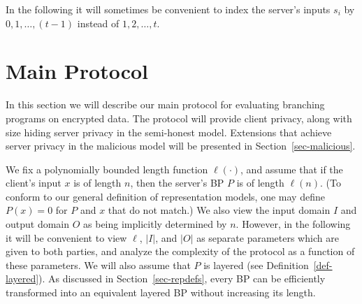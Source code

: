 \documentclass[11pt]{article}
\newcommand{\length}{{\sf length}}
\newcommand\bp{\mbox{BP}\xspace}
\begin{document}
In the following it will sometimes be convenient to index the
server's inputs $s_i$ by $0,1,\ldots,(t-1)$ instead of
$1,2,\ldots,t$.


\section{Main Protocol}
\label{sec-main}

In this section we will describe our main protocol for evaluating
branching programs on encrypted data.  The protocol will provide
client privacy, along with size hiding server privacy in the
semi-honest model. Extensions that achieve server privacy in the
malicious model will be presented in Section~\ref{sec-malicious}.

We fix a polynomially bounded length function $\ell(\cdot)$, and
assume that if the client's input $x$ is of length $n$, then the
server's BP $P$ is of length $\ell(n)$. (To conform to our general
definition of representation models, one may define $P(x)=0$ for $P$
and $x$ that do not match.) We also view the input domain $I$ and
output domain $O$ as being implicitly determined by $n$.  However,
in the following it will be convenient to view $\ell$, $|I|$, and
$|O|$ as  separate parameters which are given to both parties, and
analyze the complexity of the protocol as a function of these
parameters.  We will also assume that $P$ is layered (see
Definition~\ref{def-layered}). As discussed in
Section~\ref{sec-repdefs}, every BP can be efficiently transformed
into an equivalent layered BP without increasing its length.
\end{document}
